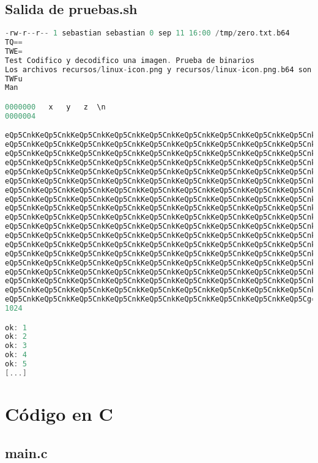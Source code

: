 \documentclass[a4paper,11pt, margin=1in]{article}
\begin{document}
\subsection{Salida de pruebas.sh}
\begin{lstlisting}[language=c,breaklines=true]
-rw-r--r-- 1 sebastian sebastian 0 sep 11 16:00 /tmp/zero.txt.b64
TQ==
TWE=
Test Codifico y decodifico una imagen. Prueba de binarios
Los archivos recursos/linux-icon.png y recursos/linux-icon.png.b64 son identicos
TWFu
Man

0000000   x   y   z  \n
0000004

eQp5CnkKeQp5CnkKeQp5CnkKeQp5CnkKeQp5CnkKeQp5CnkKeQp5CnkKeQp5CnkKeQp5CnkK
eQp5CnkKeQp5CnkKeQp5CnkKeQp5CnkKeQp5CnkKeQp5CnkKeQp5CnkKeQp5CnkKeQp5CnkK
eQp5CnkKeQp5CnkKeQp5CnkKeQp5CnkKeQp5CnkKeQp5CnkKeQp5CnkKeQp5CnkKeQp5CnkK
eQp5CnkKeQp5CnkKeQp5CnkKeQp5CnkKeQp5CnkKeQp5CnkKeQp5CnkKeQp5CnkKeQp5CnkK
eQp5CnkKeQp5CnkKeQp5CnkKeQp5CnkKeQp5CnkKeQp5CnkKeQp5CnkKeQp5CnkKeQp5CnkK
eQp5CnkKeQp5CnkKeQp5CnkKeQp5CnkKeQp5CnkKeQp5CnkKeQp5CnkKeQp5CnkKeQp5CnkK
eQp5CnkKeQp5CnkKeQp5CnkKeQp5CnkKeQp5CnkKeQp5CnkKeQp5CnkKeQp5CnkKeQp5CnkK
eQp5CnkKeQp5CnkKeQp5CnkKeQp5CnkKeQp5CnkKeQp5CnkKeQp5CnkKeQp5CnkKeQp5CnkK
eQp5CnkKeQp5CnkKeQp5CnkKeQp5CnkKeQp5CnkKeQp5CnkKeQp5CnkKeQp5CnkKeQp5CnkK
eQp5CnkKeQp5CnkKeQp5CnkKeQp5CnkKeQp5CnkKeQp5CnkKeQp5CnkKeQp5CnkKeQp5CnkK
eQp5CnkKeQp5CnkKeQp5CnkKeQp5CnkKeQp5CnkKeQp5CnkKeQp5CnkKeQp5CnkKeQp5CnkK
eQp5CnkKeQp5CnkKeQp5CnkKeQp5CnkKeQp5CnkKeQp5CnkKeQp5CnkKeQp5CnkKeQp5CnkK
eQp5CnkKeQp5CnkKeQp5CnkKeQp5CnkKeQp5CnkKeQp5CnkKeQp5CnkKeQp5CnkKeQp5CnkK
eQp5CnkKeQp5CnkKeQp5CnkKeQp5CnkKeQp5CnkKeQp5CnkKeQp5CnkKeQp5CnkKeQp5CnkK
eQp5CnkKeQp5CnkKeQp5CnkKeQp5CnkKeQp5CnkKeQp5CnkKeQp5CnkKeQp5CnkKeQp5CnkK
eQp5CnkKeQp5CnkKeQp5CnkKeQp5CnkKeQp5CnkKeQp5CnkKeQp5CnkKeQp5CnkKeQp5CnkK
eQp5CnkKeQp5CnkKeQp5CnkKeQp5CnkKeQp5CnkKeQp5CnkKeQp5CnkKeQp5CnkKeQp5CnkK
eQp5CnkKeQp5CnkKeQp5CnkKeQp5CnkKeQp5CnkKeQp5CnkKeQp5CnkKeQp5CnkKeQp5CnkK
eQp5CnkKeQp5CnkKeQp5CnkKeQp5CnkKeQp5CnkKeQp5CnkKeQp5CnkKeQp5CnkKeQp5Cg==
1024

ok: 1
ok: 2
ok: 3
ok: 4
ok: 5
[...]
\end{lstlisting}

\section{Código en C}

\subsection{main.c}
\end{document}

